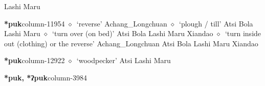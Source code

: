          Lashi 
\hspace{1ex}
         Maru 
  \item {\footnotesize \textbf{*puk}}{\tiny column-11954}
         $\diamond$~`reverse'
         Achang\_Longchuan 
\hspace{1ex}
         $\diamond$~`plough / till'
         Atsi 
\hspace{1ex}
         Bola 
\hspace{1ex}
         Lashi 
\hspace{1ex}
         Maru 
\hspace{1ex}
         $\diamond$~`turn over (on bed)'
         Atsi 
\hspace{1ex}
         Bola 
\hspace{1ex}
         Lashi 
\hspace{1ex}
         Maru 
\hspace{1ex}
         Xiandao 
\hspace{1ex}
         $\diamond$~`turn inside out (clothing) or the reverse'
         Achang\_Longchuan 
\hspace{1ex}
         Atsi 
\hspace{1ex}
         Bola 
\hspace{1ex}
         Lashi 
\hspace{1ex}
         Maru 
\hspace{1ex}
         Xiandao 
  \item {\footnotesize \textbf{*puk}}{\tiny column-12922}
         $\diamond$~`woodpecker'
         Atsi 
\hspace{1ex}
         Lashi 
\hspace{1ex}
         Maru 
  \item {\footnotesize \textbf{*puk, *ʔpuk}}{\tiny column-3984}
